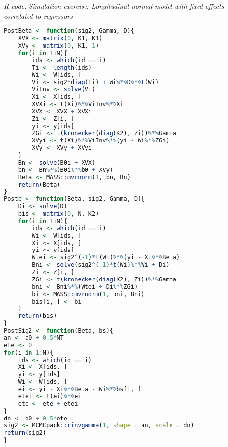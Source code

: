 \begin{enumerate}[leftmargin=*]
\begin{tcolorbox}[enhanced,width=4.67in,center upper,
	fontupper=\large\bfseries,drop shadow southwest,sharp corners]
	\textit{R code. Simulation exercise: Longitudinal normal model with fixed effects correlated to regressors}
	\begin{VF}
		\begin{lstlisting}[language=R]
PostBeta <- function(sig2, Gamma, D){
	XVX <- matrix(0, K1, K1)
	XVy <- matrix(0, K1, 1)
	for(i in 1:N){
		ids <- which(id == i)
		Ti <- length(ids)
		Wi <- W[ids, ]
		Vi <- sig2*diag(Ti) + Wi%*%D%*%t(Wi)
		ViInv <- solve(Vi)
		Xi <- X[ids, ]
		XVXi <- t(Xi)%*%ViInv%*%Xi
		XVX <- XVX + XVXi
		Zi <- Z[i, ]
		yi <- y[ids]
		ZGi <- t(kronecker(diag(K2), Zi))%*%Gamma
		XVyi <- t(Xi)%*%ViInv%*%(yi - Wi%*%ZGi)
		XVy <- XVy + XVyi
	}
	Bn <- solve(B0i + XVX)
	bn <- Bn%*%(B0i%*%b0 + XVy)
	Beta <- MASS::mvrnorm(1, bn, Bn)
	return(Beta)
}
Postb <- function(Beta, sig2, Gamma, D){
	Di <- solve(D)
	bis <- matrix(0, N, K2)
	for(i in 1:N){
		ids <- which(id == i)
		Wi <- W[ids, ]
		Xi <- X[ids, ]
		yi <- y[ids]
		Wtei <- sig2^(-1)*t(Wi)%*%(yi - Xi%*%Beta)
		Bni <- solve(sig2^(-1)*t(Wi)%*%Wi + Di)
		Zi <- Z[i, ]
		ZGi <- t(kronecker(diag(K2), Zi))%*%Gamma
		bni <- Bni%*%(Wtei + Di%*%ZGi)
		bi <- MASS::mvrnorm(1, bni, Bni)
		bis[i, ] <- bi
	}
	return(bis)
}
PostSig2 <- function(Beta, bs){
an <- a0 + 0.5*NT
ete <- 0
for(i in 1:N){
	ids <- which(id == i)
	Xi <- X[ids, ]
	yi <- y[ids]
	Wi <- W[ids, ]
	ei <- yi - Xi%*%Beta - Wi%*%bs[i, ]
	etei <- t(ei)%*%ei
	ete <- ete + etei
}
dn <- d0 + 0.5*ete 
sig2 <- MCMCpack::rinvgamma(1, shape = an, scale = dn)
return(sig2)
}
\end{lstlisting}
	\end{VF}
\end{tcolorbox}


\end{enumerate}

